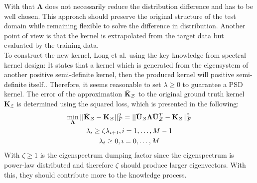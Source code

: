 With that $\boldsymbol{\Lambda}$ does not necessarily reduce the distribution difference and has to be well chosen.
This approach should preserve the original structure of the test domain while remaining flexible to solve the difference in distribution.
Another point of view is that the kernel is extrapolated from the target data but evaluated by the training data.\cite{Long.2015}\\
To construct the new kernel, Long et al. using the key knowledge from spectral kernel design:
It states that a kernel which is generated from the eigensystem of another positive semi-definite kernel, then the produced kernel will positive semi-definite itself.\cite{KaiZhang.2013}.
Therefore, it seems reasonable to set $\lambda \ge 0$ to guarantee a \acs{PSD} kernel.
The error of the approximation $\bar{\mathbf{K}}_\mathcal{Z}$ to the original ground truth kernel $\mathbf{K}_\mathcal{Z}$ is determined using the squared loss, which is presented in the following:\cite{Long.2015}
\begin{equation}\label{EqTKLSquareErrorLoss}
	\begin{gathered}
		\min_{\boldsymbol{\Lambda}} || \bar{\mathbf{K}}_\mathcal{Z} - \mathbf{K}_\mathcal{Z}||^2_F = || \bar{\mathbf{U}}_\mathcal{Z} \boldsymbol{\Lambda}  \bar{\mathbf{U}}_\mathcal{Z}^T - \mathbf{K}_\mathcal{Z} ||^2_F \\
		\lambda_i \ge \zeta \lambda_{i+1}, i = 1,\dots,M-1 \\
		\lambda_i \ge 0,  i = 0,\dots,M
	\end{gathered}
\end{equation}
With $\zeta \ge 1$ is the eigenspectrum dumping factor since the eigenspectrum is power-law distributed and therefore $\zeta$ should produce larger eigenvectors.
With this, they should contribute more to the knowledge process.\cite{Long.2015}
